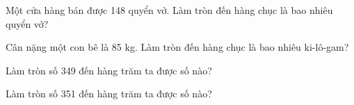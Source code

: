 \begin{ex}
Một cửa hàng bán được 148 quyển vở. Làm tròn đến hàng chục là bao nhiêu quyển vở?
\end{ex}

\begin{ex}
Cân nặng một con bê là 85 kg. Làm tròn đến hàng chục là bao nhiêu ki-lô-gam?
\end{ex}

\begin{ex}
Làm tròn số 349 đến hàng trăm ta được số nào?
\end{ex}

\begin{ex}
Làm tròn số 351 đến hàng trăm ta được số nào?
\end{ex}
